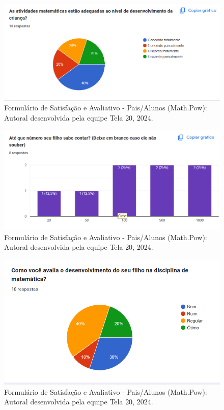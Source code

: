 \documentclass[12pt, openany, oneside, a4paper, english, brazil]{abntex2}   %
\begin{document}
\begin{figure}
    \centering
    \includegraphics{figuras/Formulário Gráficos/Pais/3 As atividades estao adequadas ao nivel de desenvolvimento da crianca.png}
    \caption{Formulário de Satisfação e Avaliativo  - Pais/Alunos (Math.Pow):  Autoral desenvolvida pela equipe Tela 20, 2024.}
    \label{gráfico gerado pelo formulário}
\end{figure}

\begin{figure}
    \centering
    \includegraphics[width=0.9\linewidth]{figuras/Formulário Gráficos/Pais/4 Ate que numero seu filho sabe contar.png}
    \caption{Formulário de Satisfação e Avaliativo  - Pais/Alunos (Math.Pow):  Autoral desenvolvida pela equipe Tela 20, 2024.}
    \label{gráfico gerado pelo formulário}
\end{figure}

\begin{figure}
    \centering
    \includegraphics{figuras/Formulário Gráficos/Pais/5 Como voce avalia o desenvolvimento do seu filho na disciplina.png}
    \caption{Formulário de Satisfação e Avaliativo  - Pais/Alunos (Math.Pow):  Autoral desenvolvida pela equipe Tela 20, 2024.}
    \label{gráfico gerado pelo formulário}
\end{figure}
\end{document}
